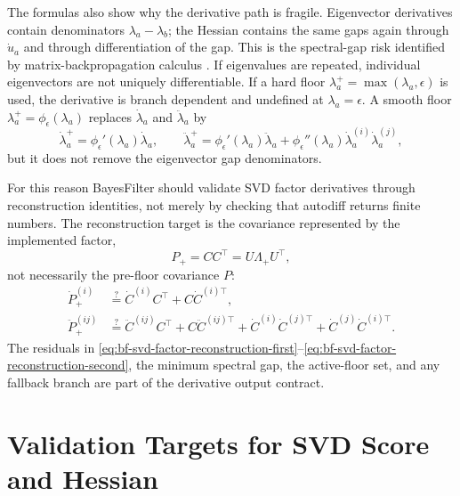 The formulas also show why the derivative path is fragile.  Eigenvector
derivatives contain denominators $\lambda_a-\lambda_b$; the Hessian contains
the same gaps again through $\dot u_a$ and through differentiation of the gap.
This is the spectral-gap risk identified by matrix-backpropagation calculus
\citep{ionescu2015matrixbackprop}.  If eigenvalues are repeated, individual
eigenvectors are not uniquely differentiable.  If a hard floor
$\lambda_a^+=\max(\lambda_a,\epsilon)$ is used, the derivative is branch
dependent and undefined at $\lambda_a=\epsilon$.  A smooth floor
$\lambda_a^+=\phi_\epsilon(\lambda_a)$ replaces
$\dot\lambda_a$ and $\ddot\lambda_a$ by
\[
  \dot\lambda_a^+=\phi_\epsilon'(\lambda_a)\dot\lambda_a,\qquad
  \ddot\lambda_a^+
  =
  \phi_\epsilon'(\lambda_a)\ddot\lambda_a
  +\phi_\epsilon''(\lambda_a)\dot\lambda_a^{(i)}\dot\lambda_a^{(j)},
\]
but it does not remove the eigenvector gap denominators.

For this reason BayesFilter should validate SVD factor derivatives through
reconstruction identities, not merely by checking that autodiff returns finite
numbers.  The reconstruction target is the covariance represented by the
implemented factor,
\[
  P_+ = CC^\top=U\Lambda_+U^\top,
\]
not necessarily the pre-floor covariance $P$:
\begin{align}
\label{eq:bf-svd-factor-reconstruction-first}
  \dot P_+^{(i)}
  &\stackrel{?}{=}
  \dot C^{(i)}C^\top+C\dot C^{(i)\top},\\
\label{eq:bf-svd-factor-reconstruction-second}
  \ddot P_+^{(ij)}
  &\stackrel{?}{=}
  \ddot C^{(ij)}C^\top+C\ddot C^{(ij)\top}
  +\dot C^{(i)}\dot C^{(j)\top}
  +\dot C^{(j)}\dot C^{(i)\top}.
\end{align}
The residuals in
\eqref{eq:bf-svd-factor-reconstruction-first}--\eqref{eq:bf-svd-factor-reconstruction-second},
the minimum spectral gap, the active-floor set, and any fallback branch are part
of the derivative output contract.

\section{Validation Targets for SVD Score and Hessian}
\label{sec:bf-svd-sp-derivative-validation}

